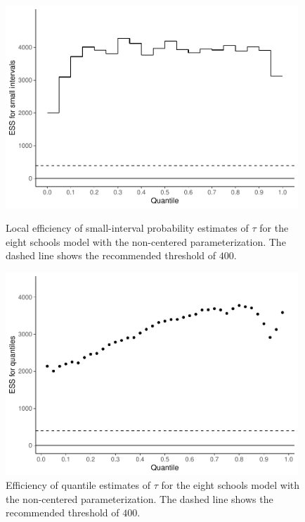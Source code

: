 \documentclass[american,]{article}
\theoremstyle{definition}
\begin{document}
\begin{figure}[tp]
  \begin{minipage}{0.48\textwidth}
  \centering
  \includegraphics[width=0.98\textwidth]{graphics/local-ess-fit-ncp2-1.pdf}
  \caption{Local efficiency of small-interval probability estimates of $\tau$ 
  for the  eight schools model with the non-centered parameterization. The dashed line shows the
    recommended threshold of $400$.}
  \label{fig:local-ess-fit-ncp2-1}
\end{minipage}
\hfill
  \begin{minipage}{0.48\textwidth}
  \includegraphics[width=0.98\textwidth]{graphics/quantile-ess-fit-ncp2-1.pdf}
  \caption{Efficiency of quantile estimates of $\tau$ for the eight schools 
  model with the non-centered parameterization. The dashed line shows the
    recommended threshold of $400$.}
  \label{fig:quantile-ess-fit-ncp2-1}
\end{minipage}
\end{figure}
\end{document}
